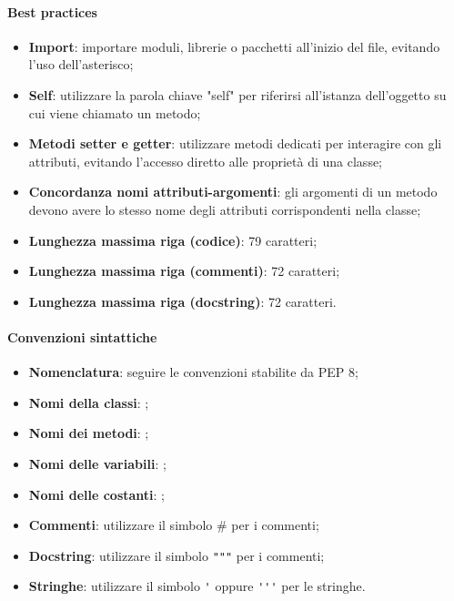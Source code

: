 \paragraph*{Best practices}
\begin{itemize}
  \item \textbf{Import}: importare moduli, librerie o pacchetti all'inizio del file, evitando l'uso dell'asterisco;
  \item \textbf{Self}: utilizzare la parola chiave "self" per riferirsi all'istanza dell'oggetto su cui viene chiamato un metodo;
  \item \textbf{Metodi setter e getter}: utilizzare metodi dedicati per interagire con gli attributi, evitando l'accesso diretto alle proprietà di una classe;
  \item \textbf{Concordanza nomi attributi-argomenti}: gli argomenti di un metodo devono avere lo stesso nome degli attributi corrispondenti nella classe;
  \item \textbf{Lunghezza massima riga (codice)}: 79 caratteri;
  \item \textbf{Lunghezza massima riga (commenti)}: 72 caratteri;
  \item \textbf{Lunghezza massima riga (docstring)}: 72 caratteri.
\end{itemize}

\paragraph*{Convenzioni sintattiche}
\begin{itemize}
  \item \textbf{Nomenclatura}: seguire le convenzioni stabilite da PEP 8;
  \item \textbf{Nomi della classi}: ;
  \item \textbf{Nomi dei metodi}: ;
  \item \textbf{Nomi delle variabili}: ;
  \item \textbf{Nomi delle costanti}: ;
  \item \textbf{Commenti}: utilizzare il simbolo \# per i commenti;
  \item \textbf{Docstring}: utilizzare il simbolo \verb|"""| per i commenti;
  \item \textbf{Stringhe}: utilizzare il simbolo \verb|'| oppure \verb|'''| per le stringhe.
\end{itemize}

